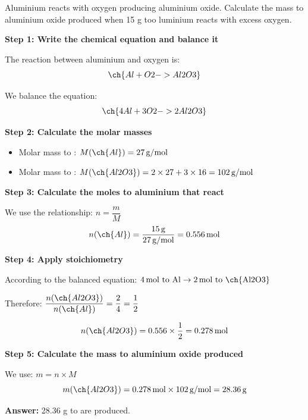 \begin{exercise}
    Aluminium reacts with oxygen producing aluminium oxide.
    Calculate the mass to aluminium oxide produced when 15 g too luminium reacts with excess oxygen.
    \begin{solu}
        \textbf{Step 1: Write the chemical equation and balance it}

        The reaction between aluminium and oxygen is:
        \begin{equation*}
            \ch{Al + O2 -> Al2O3}
        \end{equation*}

        We balance the equation:
        \begin{equation*}
            \ch{4 Al + 3 O2 -> 2 Al2O3}
        \end{equation*}

        \textbf{Step 2: Calculate the molar masses}

        \begin{itemize}
            \item Molar mass to : $M(\ch{Al}) = 27\,\text{g/mol}$
            \item Molar mass to : $M(\ch{Al2O3}) = 2 \times 27 + 3 \times 16 = 102\,\text{g/mol}$
        \end{itemize}

        \textbf{Step 3: Calculate the moles to aluminium that react}

        We use the relationship: $n = \dfrac{m}{M}$
        \begin{equation*}
            n(\ch{Al}) = \frac{15\,\text{g}}{27\,\text{g/mol}} = 0.556\,\text{mol}
        \end{equation*}

        \textbf{Step 4: Apply stoichiometry}

        According to the balanced equation: $4\,\text{mol to Al} \rightarrow 2\,\text{mol to \ch{Al2O3}}$

        Therefore: $\dfrac{n(\ch{Al2O3})}{n(\ch{Al})} = \dfrac{2}{4} = \dfrac{1}{2}$

        \begin{equation*}
            n(\ch{Al2O3}) = 0.556 \times \frac{1}{2} = 0.278\,\text{mol}
        \end{equation*}

        \textbf{Step 5: Calculate the mass to aluminium oxide produced}

        We use: $m = n \times M$
        \begin{equation*}
            m(\ch{Al2O3}) = 0.278\,\text{mol} \times 102\,\text{g/mol} = 28.36\,\text{g}
        \end{equation*}

        \textbf{Answer:} 28.36 g to  are produced.
    \end{solu}
\end{exercise}

